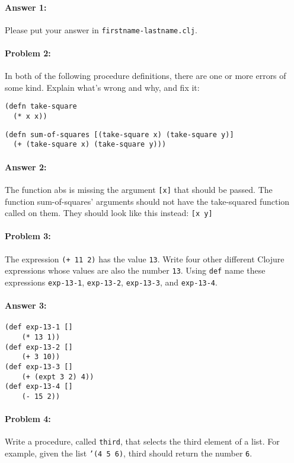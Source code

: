 \documentclass[10pt]{article}
\begin{document}
\paragraph{Answer 1:} Please put your answer in \texttt{firstname-lastname.clj}.

\hrulefill
\paragraph{Problem 2:}
In both of the following procedure definitions, there are one or more errors of
some kind. Explain what's wrong and why, and fix it:

\begin{lstlisting}
(defn take-square
  (* x x))
\end{lstlisting}

\begin{lstlisting}
(defn sum-of-squares [(take-square x) (take-square y)]
  (+ (take-square x) (take-square y)))
\end{lstlisting}

\paragraph{Answer 2:} The function abs is missing the argument \texttt{[x]} that should be passed.
 The function sum-of-squares' arguments should not have the take-squared function called on them.
 They should look like this instead: \texttt{[x y]}

\hrulefill
\paragraph{Problem 3:}
The expression \texttt{(+ 11 2)} has the value \texttt{13}. Write four
other different Clojure expressions whose values are also the number
\texttt{13}.  Using \texttt{def} name these expressions
\texttt{exp-13-1}, \texttt{exp-13-2}, \texttt{exp-13-3}, and
\texttt{exp-13-4}.

\paragraph{Answer 3:} 
\begin{lstlisting}
(def exp-13-1 []
	(* 13 1))
(def exp-13-2 []
	(+ 3 10))
(def exp-13-3 []
	(+ (expt 3 2) 4))
(def exp-13-4 []
	(- 15 2))
\end{lstlisting}

\hrulefill
\paragraph{Problem 4:}
  Write a procedure, called \texttt{third}, that selects the third
  element of a list. For example, given the list \texttt{'(4 5 6)},
  third should return the number \texttt{6}.
\end{document}
